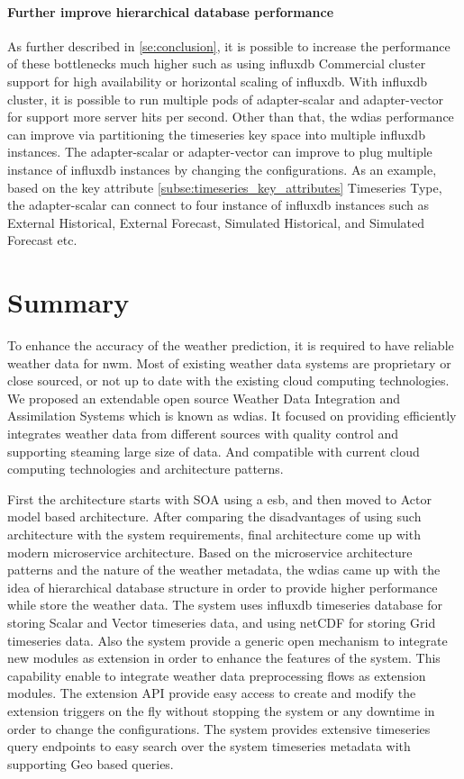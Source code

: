 \documentclass[conference]{IEEEtran}
\begin{document}
\paragraph{Further improve hierarchical database performance}
As further described in \ref{se:conclusion}, it is possible to increase the performance of these bottlenecks much higher such as using \acrshort{influxdb} Commercial cluster support for high availability or horizontal scaling of \acrshort{influxdb}. With \acrshort{influxdb} cluster, it is possible to run multiple pods of adapter-scalar and adapter-vector for support more server hits per second.
Other than that, the \acrshort{wdias} performance can improve via partitioning the timeseries key space into multiple \acrshort{influxdb} instances. The adapter-scalar or adapter-vector can improve to plug multiple instance of \acrshort{influxdb} instances by changing the configurations. As an example, based on the key attribute \ref{subse:timeseries_key_attributes} Timeseries Type, the adapter-scalar can connect to four instance of \acrshort{influxdb} instances such as  External Historical, External Forecast, Simulated Historical, and Simulated Forecast etc.

\section{Summary}
To enhance the accuracy of the weather prediction, it is required to have reliable weather data for \acrshort{nwm}. Most of existing weather data systems are proprietary or close sourced, or not up to date with the existing cloud computing technologies.
We proposed an extendable open source Weather Data Integration and Assimilation Systems which is known as \acrshort{wdias}. It focused on providing efficiently integrates weather data from different sources with quality control and supporting steaming large size of data. And compatible with current cloud computing technologies and architecture patterns.

First the architecture starts with SOA using a \acrfull{esb}, and then moved to Actor model based architecture. After comparing the disadvantages of using such architecture with the system requirements, final architecture come up with modern microservice architecture.
Based on the microservice architecture patterns and the nature of the weather metadata, the \acrshort{wdias} came up with the idea of hierarchical database structure in order to provide higher performance while store the weather data. The system uses \acrshort{influxdb} timeseries database for storing Scalar and Vector timeseries data, and using \acrshort{netCDF} for storing Grid timeseries data.
Also the system provide a generic open mechanism to integrate new modules as extension in order to enhance the features of the system. This capability enable to integrate weather data preprocessing flows as extension modules.
The extension API provide easy access to create and modify the extension triggers on the fly without stopping the system or any downtime in order to change the configurations.
The system provides extensive timeseries query endpoints to easy search over the system timeseries metadata with supporting Geo based queries.
\end{document}
